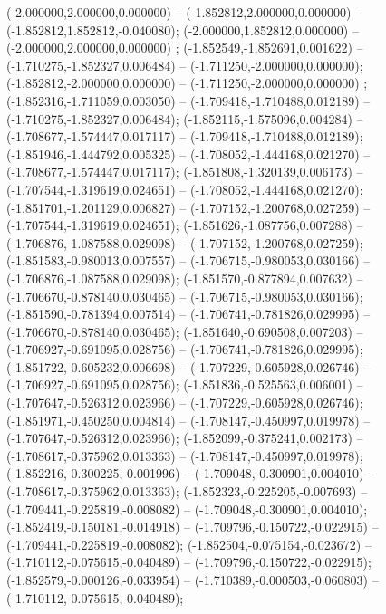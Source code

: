  (-2.000000,2.000000,0.000000) -- (-1.852812,2.000000,0.000000) -- (-1.852812,1.852812,-0.040080);
 (-2.000000,1.852812,0.000000) -- (-2.000000,2.000000,0.000000) ;
 (-1.852549,-1.852691,0.001622) -- (-1.710275,-1.852327,0.006484) -- (-1.711250,-2.000000,0.000000);
 (-1.852812,-2.000000,0.000000) -- (-1.711250,-2.000000,0.000000) ;
 (-1.852316,-1.711059,0.003050) -- (-1.709418,-1.710488,0.012189) -- (-1.710275,-1.852327,0.006484);
 (-1.852115,-1.575096,0.004284) -- (-1.708677,-1.574447,0.017117) -- (-1.709418,-1.710488,0.012189);
 (-1.851946,-1.444792,0.005325) -- (-1.708052,-1.444168,0.021270) -- (-1.708677,-1.574447,0.017117);
 (-1.851808,-1.320139,0.006173) -- (-1.707544,-1.319619,0.024651) -- (-1.708052,-1.444168,0.021270);
 (-1.851701,-1.201129,0.006827) -- (-1.707152,-1.200768,0.027259) -- (-1.707544,-1.319619,0.024651);
 (-1.851626,-1.087756,0.007288) -- (-1.706876,-1.087588,0.029098) -- (-1.707152,-1.200768,0.027259);
 (-1.851583,-0.980013,0.007557) -- (-1.706715,-0.980053,0.030166) -- (-1.706876,-1.087588,0.029098);
 (-1.851570,-0.877894,0.007632) -- (-1.706670,-0.878140,0.030465) -- (-1.706715,-0.980053,0.030166);
 (-1.851590,-0.781394,0.007514) -- (-1.706741,-0.781826,0.029995) -- (-1.706670,-0.878140,0.030465);
 (-1.851640,-0.690508,0.007203) -- (-1.706927,-0.691095,0.028756) -- (-1.706741,-0.781826,0.029995);
 (-1.851722,-0.605232,0.006698) -- (-1.707229,-0.605928,0.026746) -- (-1.706927,-0.691095,0.028756);
 (-1.851836,-0.525563,0.006001) -- (-1.707647,-0.526312,0.023966) -- (-1.707229,-0.605928,0.026746);
 (-1.851971,-0.450250,0.004814) -- (-1.708147,-0.450997,0.019978) -- (-1.707647,-0.526312,0.023966);
 (-1.852099,-0.375241,0.002173) -- (-1.708617,-0.375962,0.013363) -- (-1.708147,-0.450997,0.019978);
 (-1.852216,-0.300225,-0.001996) -- (-1.709048,-0.300901,0.004010) -- (-1.708617,-0.375962,0.013363);
 (-1.852323,-0.225205,-0.007693) -- (-1.709441,-0.225819,-0.008082) -- (-1.709048,-0.300901,0.004010);
 (-1.852419,-0.150181,-0.014918) -- (-1.709796,-0.150722,-0.022915) -- (-1.709441,-0.225819,-0.008082);
 (-1.852504,-0.075154,-0.023672) -- (-1.710112,-0.075615,-0.040489) -- (-1.709796,-0.150722,-0.022915);
 (-1.852579,-0.000126,-0.033954) -- (-1.710389,-0.000503,-0.060803) -- (-1.710112,-0.075615,-0.040489);
